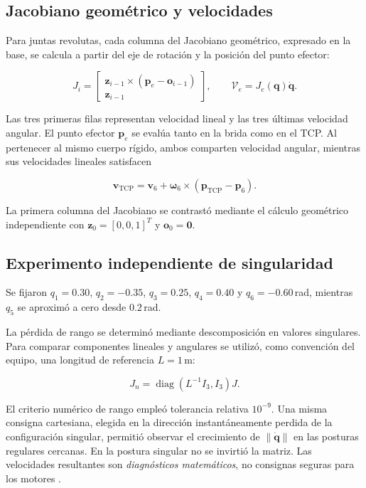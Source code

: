 \documentclass[conference]{IEEEtran}
\begin{document}
\subsection{Jacobiano geométrico y velocidades}

Para juntas revolutas, cada columna del Jacobiano geométrico, expresado en la base, se calcula a partir del eje de rotación y la posición del punto efector:

\begin{equation}
J_i=
\begin{bmatrix}
\bm z_{i-1}\times
(\bm p_e-\bm o_{i-1})\\
\bm z_{i-1}
\end{bmatrix},
\qquad
\mathcal V_e=J_e(\bm q)\dot{\bm q}.
\label{eq:jac}
\end{equation}

Las tres primeras filas representan velocidad lineal y las tres últimas velocidad angular. El punto efector $\bm p_e$ se evalúa tanto en la brida como en el TCP. Al pertenecer al mismo cuerpo rígido, ambos comparten velocidad angular, mientras sus velocidades lineales satisfacen

\begin{equation}
\bm v_{\mathrm{TCP}}
=\bm v_6+
\bm\omega_6\times
(\bm p_{\mathrm{TCP}}-\bm p_6).
\label{eq:veltcp}
\end{equation}

La primera columna del Jacobiano se contrastó mediante el cálculo geométrico independiente con $\bm z_0=[0,0,1]^T$ y $\bm o_0=\bm0$.

\subsection{Experimento independiente de singularidad}

Se fijaron $q_1=0.30$, $q_2=-0.35$, $q_3=0.25$, $q_4=0.40$ y $q_6=-0.60$\,rad, mientras $q_5$ se aproximó a cero desde $0.2$\,rad.

La pérdida de rango se determinó mediante descomposición en valores singulares. Para comparar componentes lineales y angulares se utilizó, como convención del equipo, una longitud de referencia $L=1$\,m:

\begin{equation}
J_n=\operatorname{diag}
(L^{-1}I_3,I_3)J.
\label{eq:jn}
\end{equation}

El criterio numérico de rango empleó tolerancia relativa $10^{-9}$. Una misma consigna cartesiana, elegida en la dirección instantáneamente perdida de la configuración singular, permitió observar el crecimiento de $\|\dot{\bm q}\|$ en las posturas regulares cercanas. En la postura singular no se invirtió la matriz. Las velocidades resultantes son \emph{diagnósticos matemáticos}, no consignas seguras para los motores \cite{rubricaH2}.
\end{document}
